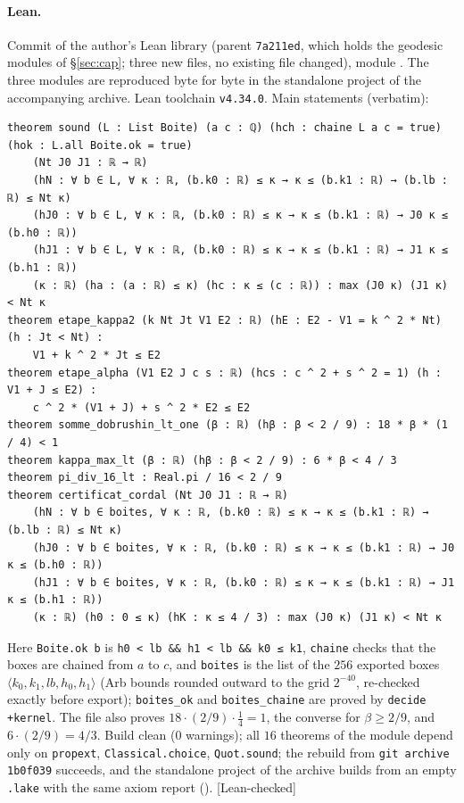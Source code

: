 \documentclass[11pt,a4paper]{article}
\theoremstyle{remark}
\theoremstyle{definition}
\theoremstyle{plain}
\theoremstyle{remark}
\newcommand{\st}[1]{\textsf{[#1]}}
\begin{document}
\paragraph{Lean.} Commit  of the author's Lean library (parent
\texttt{7a211ed}, which holds the geodesic modules of \S\ref{sec:cap}; three new files, no existing file changed),
module . The three modules are reproduced byte for byte in the standalone
project  of the accompanying archive. Lean toolchain \texttt{v4.34.0}. Main statements (verbatim):
{\scriptsize
\begin{verbatim}
theorem sound (L : List Boite) (a c : ℚ) (hch : chaine L a c = true) (hok : L.all Boite.ok = true)
    (Nt J0 J1 : ℝ → ℝ)
    (hN : ∀ b ∈ L, ∀ κ : ℝ, (b.k0 : ℝ) ≤ κ → κ ≤ (b.k1 : ℝ) → (b.lb : ℝ) ≤ Nt κ)
    (hJ0 : ∀ b ∈ L, ∀ κ : ℝ, (b.k0 : ℝ) ≤ κ → κ ≤ (b.k1 : ℝ) → J0 κ ≤ (b.h0 : ℝ))
    (hJ1 : ∀ b ∈ L, ∀ κ : ℝ, (b.k0 : ℝ) ≤ κ → κ ≤ (b.k1 : ℝ) → J1 κ ≤ (b.h1 : ℝ))
    (κ : ℝ) (ha : (a : ℝ) ≤ κ) (hc : κ ≤ (c : ℝ)) : max (J0 κ) (J1 κ) < Nt κ
theorem etape_kappa2 (k Nt Jt V1 E2 : ℝ) (hE : E2 - V1 = k ^ 2 * Nt) (h : Jt < Nt) :
    V1 + k ^ 2 * Jt ≤ E2
theorem etape_alpha (V1 E2 J c s : ℝ) (hcs : c ^ 2 + s ^ 2 = 1) (h : V1 + J ≤ E2) :
    c ^ 2 * (V1 + J) + s ^ 2 * E2 ≤ E2
theorem somme_dobrushin_lt_one (β : ℝ) (hβ : β < 2 / 9) : 18 * β * (1 / 4) < 1
theorem kappa_max_lt (β : ℝ) (hβ : β < 2 / 9) : 6 * β < 4 / 3
theorem pi_div_16_lt : Real.pi / 16 < 2 / 9
theorem certificat_cordal (Nt J0 J1 : ℝ → ℝ)
    (hN : ∀ b ∈ boites, ∀ κ : ℝ, (b.k0 : ℝ) ≤ κ → κ ≤ (b.k1 : ℝ) → (b.lb : ℝ) ≤ Nt κ)
    (hJ0 : ∀ b ∈ boites, ∀ κ : ℝ, (b.k0 : ℝ) ≤ κ → κ ≤ (b.k1 : ℝ) → J0 κ ≤ (b.h0 : ℝ))
    (hJ1 : ∀ b ∈ boites, ∀ κ : ℝ, (b.k0 : ℝ) ≤ κ → κ ≤ (b.k1 : ℝ) → J1 κ ≤ (b.h1 : ℝ))
    (κ : ℝ) (h0 : 0 ≤ κ) (hK : κ ≤ 4 / 3) : max (J0 κ) (J1 κ) < Nt κ
\end{verbatim}}
Here \texttt{Boite.ok b} is \texttt{h0 < lb \&\& h1 < lb \&\& k0 ≤ k1}, \texttt{chaine} checks that the boxes are
chained from $a$ to $c$, and \texttt{boites} is the list of the $256$ exported boxes $\langle k_0,k_1,lb,h_0,h_1\rangle$
(Arb bounds rounded outward to the grid $2^{-40}$, re-checked exactly before export); \texttt{boites\_ok} and
\texttt{boites\_chaine} are proved by \texttt{decide +kernel}. The file also proves $18\cdot(2/9)\cdot\frac14=1$, the
converse for $\beta\ge2/9$, and $6\cdot(2/9)=4/3$. Build clean (0 warnings); all $16$ theorems of the module depend
only on \texttt{propext}, \texttt{Classical.choice}, \texttt{Quot.sound}; the rebuild from \texttt{git archive 1b0f039}
succeeds, and the standalone project  of the archive builds from an empty \texttt{.lake} with the same
axiom report (). \st{Lean-checked}
\end{document}
